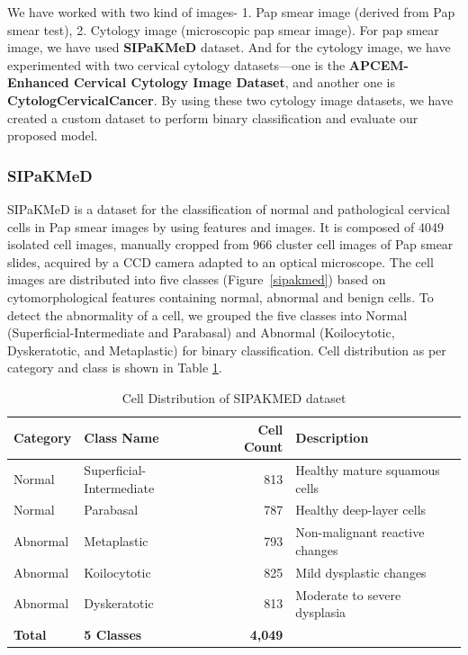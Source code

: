 \documentclass[pdflatex,sn-nature]{sn-jnl}%
\theoremstyle{thmstyleone}%
\theoremstyle{thmstyletwo}%
\theoremstyle{thmstylethree}%
\begin{document}
We have worked with two kind of images- 1. Pap smear image (derived from Pap smear test), 2. Cytology image (microscopic pap smear image). For pap smear image, we have used \textbf{SIPaKMeD}\cite{Lite38} dataset. And for the cytology image, we have experimented with two cervical cytology datasets—one is the \textbf{APCEM-Enhanced Cervical Cytology Image Dataset}\cite{aswini2026apcem}, and another one is \textbf{CytologCervicalCancer}\cite{jnx03_2025}. By using these two cytology image datasets, we have created a custom dataset to perform binary classification and evaluate our proposed model. 

\subsubsection{SIPaKMeD}
SIPaKMeD is a dataset for the classification of normal and pathological cervical cells in Pap smear images by using features and images. It is composed of 4049 isolated cell images, manually cropped from 966 cluster cell images of Pap smear slides, acquired by a CCD camera adapted to an optical microscope\cite{Lite38}. The cell images are distributed into five classes (Figure~\ref{sipakmed}) based on cytomorphological features containing normal, abnormal and benign cells. 
To detect the abnormality of a cell, we grouped the five classes into Normal (Superficial-Intermediate and Parabasal) and Abnormal (Koilocytotic, Dyskeratotic, and Metaplastic) for binary classification\cite{10.3389/fonc.2025.1703772}. Cell distribution as per category and class is shown in Table \ref{tab:cell_distribution}.

\begin{table}[htbp]
    \centering
    \caption{Cell Distribution of SIPAKMED dataset}
    \label{tab:cell_distribution}
    \begin{tabular}{llrl}
        \toprule
        \textbf{Category} & \textbf{Class Name} & \textbf{Cell Count} & \textbf{Description} \\
        \midrule
        Normal & Superficial-Intermediate & 813 & Healthy mature squamous cells \\
        Normal & Parabasal & 787 & Healthy deep-layer cells \\
        Abnormal & Metaplastic & 793 & Non-malignant reactive changes \\
        Abnormal & Koilocytotic & 825 & Mild dysplastic changes \\
        Abnormal & Dyskeratotic & 813 & Moderate to severe dysplasia \\
        \midrule
        \textbf{Total} & \textbf{5 Classes} & \textbf{4,049} & \textbf{} \\
        \bottomrule
    \end{tabular}
\end{table}
\end{document}
